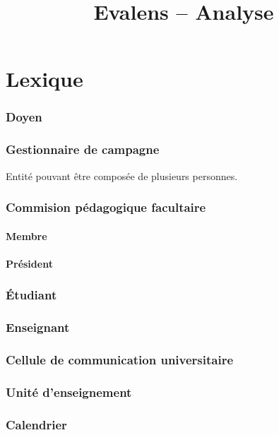 \documentclass[a4paper,11pt]{report}
\title{Evalens -- Analyse}
\date{}
\begin{document}
\maketitle
\tableofcontents

\chapter{Lexique}

\subsection{Doyen}

\subsection{Gestionnaire de campagne}
Entité pouvant être composée de plusieurs personnes.

\subsection{Commision pédagogique facultaire}
\subsubsection{Membre}
\subsubsection{Président}

\subsection{Étudiant}

\subsection{Enseignant}

\subsection{Cellule de communication universitaire}

\subsection{Unité d'enseignement}

\subsection{Calendrier}
\end{document}
